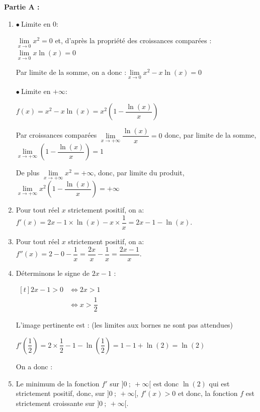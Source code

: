 \medskip

\textbf{Partie A :}

\medskip

\begin{enumerate}
	\item $\bullet~$Limite en 0:

$\lim\limits_{x\to 0} x^2 =0$ et, d'après la propriété des croissances comparées : \quad $\lim\limits_{x\to 0}x\ln(x)=0$

Par limite de la somme,  on a donc :\quad $\lim\limits_{x\to 0} x^2-x\ln(x)=0$

$\bullet~$Limite en $+\infty$:

$f(x)=x^2-x\ln(x)=x^2 \left(1-\dfrac{\ln(x)}{x}\right)$

	Par croissances comparées $\lim\limits_{x\to +\infty}\dfrac{\ln(x)}{x}=0$ donc, par limite de la somme, $\lim\limits_{x\to +\infty}\left( 1- \dfrac{\ln(x)}{x}\right)=1$

	De plus $\lim\limits_{x\to +\infty} x^2 =+\infty$, donc, par limite du produit,  $\lim\limits_{x\to +\infty } x^2 \left(1-\dfrac{\ln(x)}{x}\right)=+\infty$

	\item  Pour tout réel $x$ strictement positif, on a: $f'(x) =2x -1 \times \ln(x) -x \times \dfrac{1}{x}= 2x -1 -\ln(x)$.

	\item  Pour tout réel $x$ strictement positif, on a: $f''(x) =2- 0 - \dfrac{1}{x}= \dfrac{2x}{x} -\dfrac{1}{x}= \dfrac{2x-1}{x}$.

	\item  	Déterminons le signe de $2x-1$ :

	$\begin{aligned}[t] 2x-1 >0 &\iff 2x > 1 \\
	&\iff x>\dfrac{1}{2}\end{aligned}$

	L'image pertinente est : (les limites aux bornes ne sont pas attendues)


	$f'\left( \dfrac{1}{2}\right)= 2 \times \dfrac{1}{2}-1-\ln\left(\dfrac{1}{2} \right)= 1-1+\ln(2)=\ln(2)$

	On a donc :


	\item Le minimum  de la fonction $f'$ sur $]0~;~+\infty[$  est donc $\ln(2)$ qui est strictement positif,  donc, sur $]0~;~+\infty[$, $f'(x)>0$ et donc, la fonction $f$ est strictement croissante sur   $]0~;~+\infty[$.
\end{enumerate}


